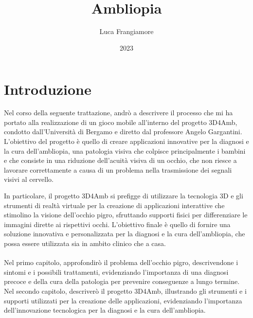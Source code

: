 \documentclass[
a4paper,
cleardoublepage=empty,
headings=twolinechapter,
numbers=autoenddot,
]{scrbook}
\title{Ambliopia}
\author{Luca Frangiamore}
\date{2023}
\begin{document}
	
	\frontmatter
	
	
	\begin{frontespizio}
		\Margini{3cm}{3cm}{3cm}{3cm}
		\Punteggiatura{}
		
	\end{frontespizio}
	
	\tableofcontents
	\listoffigures
	\mainmatter
	
	
	\chapter*{Introduzione}
	Nel corso della seguente trattazione, andrò a descrivere il processo che mi ha portato alla realizzazione di un gioco mobile all'interno del progetto 3D4Amb, condotto dall'Università di Bergamo e diretto dal professore Angelo Gargantini. L'obiettivo del progetto è quello di creare applicazioni innovative per la diagnosi e la cura dell'ambliopia, una patologia visiva che colpisce principalmente i bambini e che consiste in una riduzione dell'acuità visiva di un occhio, che non riesce a lavorare correttamente a causa di un problema nella trasmissione dei segnali visivi al cervello.
	
	In particolare, il progetto 3D4Amb si prefigge di utilizzare la tecnologia 3D e gli strumenti di realtà virtuale per la creazione di applicazioni interattive che stimolino la visione dell'occhio pigro, sfruttando supporti fisici per differenziare le immagini dirette ai rispettivi occhi. L'obiettivo finale è quello di fornire una soluzione innovativa e personalizzata per la diagnosi e la cura dell'ambliopia, che possa essere utilizzata sia in ambito clinico che a casa.\\\\
	
	Nel primo capitolo, approfondirò il problema dell'occhio pigro, descrivendone i sintomi e i possibili trattamenti, evidenziando l'importanza di una diagnosi precoce e della cura della patologia per prevenire conseguenze a lungo termine. Nel secondo capitolo, descriverò il progetto 3D4Amb, illustrando gli strumenti e i supporti utilizzati per la creazione delle applicazioni, evidenziando l'importanza dell'innovazione tecnologica per la diagnosi e la cura dell'ambliopia.\\\\
	
\end{document}
